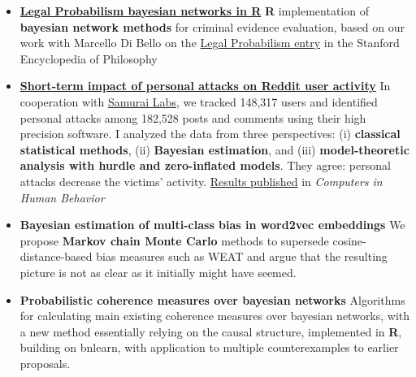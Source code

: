\documentclass[10pt, a4paper]{article}
\begin{document}
\begin{itemize} [leftmargin=*]
	
	
	
\item 	\href{https://rfl-urbaniak.github.io/LegalProbabilismBNs/}{\textbf{Legal Probabilism bayesian networks in R}} 
 \newline  \scriptsize \textbf{\textsf{R}} implementation  of \textbf{bayesian network methods} for criminal evidence evaluation, based on our work with  Marcello Di Bello on the \newline \href{https://plato.stanford.edu/entries/legal-probabilism/}{Legal  Probabilism entry} in the Stanford Encyclopedia of Philosophy


\vspace{-1mm}

\normalsize 
\item 	\href{https://rfl-urbaniak.github.io/redditAttacks/}{
	\textbf{Short-term impact of personal attacks on Reddit user  activity}} 
\newline  \scriptsize  In cooperation with \href{https://www.samurailabs.ai/}{Samurai Labs}, we tracked 148,317 users  and identified personal attacks among 182,528 posts and comments  using their high precision software. I  analyzed the data  from three perspectives: (i) \textbf{classical statistical methods}, (ii) \textbf{Bayesian estimation}, and (iii) \textbf{model-theoretic analysis with hurdle and zero-inflated models}. They  agree: personal attacks decrease the victims' activity. \href{https://www.sciencedirect.com/science/article/abs/pii/S0747563221002958}{Results published} in \emph{Computers in Human Behavior}


\vspace{-1mm}

\normalsize 
\item 	%
\textbf{Bayesian estimation of multi-class bias in word2vec embeddings}%
\newline  \scriptsize We  propose \textbf{Markov chain Monte Carlo} methods  to supersede cosine-distance-based bias measures such as WEAT and argue that the resulting picture is not as clear as it initially might have seemed. 



\vspace{-1mm}

\normalsize 
\item 	%
\textbf{Probabilistic coherence measures over bayesian networks}%
\newline  \scriptsize Algorithms for calculating  main existing coherence measures over bayesian networks, with a new method essentially relying on the causal structure,  implemented in \textbf{\textsf{R}}, building on \textsf{bnlearn}, with application to multiple counterexamples to earlier proposals.





\end{itemize}
\end{document}
